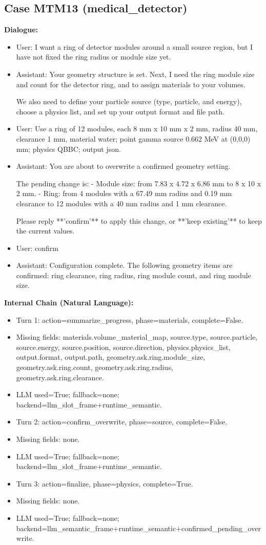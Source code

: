 \documentclass[11pt]{ctexart}
\begin{document}
\subsection{Case MTM13 (medical\_detector)}
\textbf{Dialogue:}
\begin{itemize}
\item User: I want a ring of detector modules around a small source region, but I have not fixed the ring radius or module size yet.
\item Assistant: Your geometry structure is set. Next, I need the ring module size and count for the detector ring, and to assign materials to your volumes.

We also need to define your particle source (type, particle, and energy), choose a physics list, and set up your output format and file path.
\item User: Use a ring of 12 modules, each 8 mm x 10 mm x 2 mm, radius 40 mm, clearance 1 mm, material water; point gamma source 0.662 MeV at (0,0,0) mm; physics QBBC; output json.
\item Assistant: You are about to overwrite a confirmed geometry setting.

The pending change is:
- Module size: from 7.83 x 4.72 x 6.86 mm to 8 x 10 x 2 mm.
- Ring: from 4 modules with a 67.49 mm radius and 0.19 mm clearance to 12 modules with a 40 mm radius and 1 mm clearance.

Please reply **'confirm'** to apply this change, or **'keep existing'** to keep the current values.
\item User: confirm
\item Assistant: Configuration complete. The following geometry items are confirmed: ring clearance, ring radius, ring module count, and ring module size.
\end{itemize}
\textbf{Internal Chain (Natural Language):}
\begin{itemize}
\item Turn 1: action=summarize\_progress, phase=materials, complete=False.
\item Missing fields: materials.volume\_material\_map, source.type, source.particle, source.energy, source.position, source.direction, physics.physics\_list, output.format, output.path, geometry.ask.ring.module\_size, geometry.ask.ring.count, geometry.ask.ring.radius, geometry.ask.ring.clearance.
\item LLM used=True; fallback=none; backend=llm\_slot\_frame+runtime\_semantic.
\item Turn 2: action=confirm\_overwrite, phase=source, complete=False.
\item Missing fields: none.
\item LLM used=True; fallback=none; backend=llm\_slot\_frame+runtime\_semantic.
\item Turn 3: action=finalize, phase=physics, complete=True.
\item Missing fields: none.
\item LLM used=True; fallback=none; backend=llm\_semantic\_frame+runtime\_semantic+confirmed\_pending\_overwrite.
\end{itemize}
\end{document}
